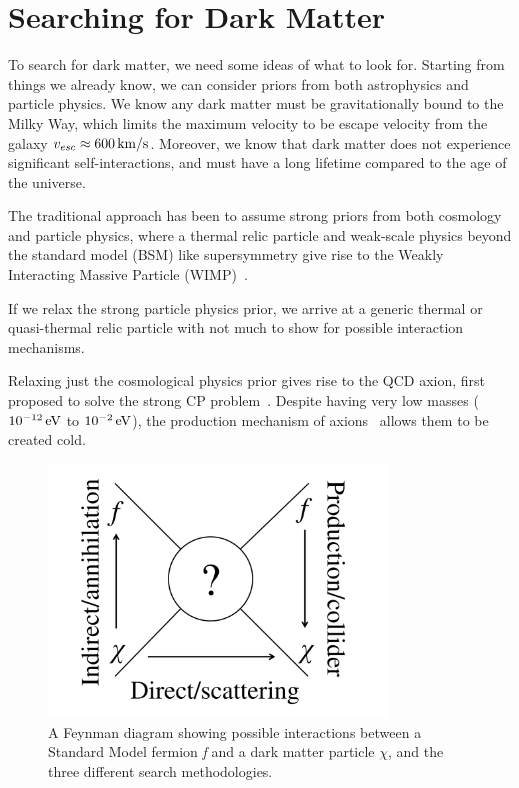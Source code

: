 \section{Searching for Dark Matter}

To search for dark matter, we need some ideas of what to look for. Starting from things we already know, we can consider priors from both astrophysics and particle physics. We know any dark matter must be gravitationally bound to the Milky Way, which limits the maximum velocity to be escape velocity from the galaxy $v_{esc} \approx 600\,\mathrm{km/s}$. Moreover, we know that dark matter does not experience significant self-interactions, and must have a long lifetime compared to the age of the universe.

The traditional approach has been to assume strong priors from both cosmology and particle physics, where a thermal relic particle and weak-scale physics beyond the standard model (BSM) like supersymmetry give rise to the Weakly Interacting Massive Particle (WIMP)~\cite{Jungman:1995df}.

If we relax the strong particle physics prior, we arrive at a generic thermal or quasi-thermal relic particle with not much to show for possible interaction mechanisms.

Relaxing just the cosmological physics prior gives rise to the QCD axion, first proposed to solve the strong CP problem~\cite{Peccei:1977,Weinberg:1978,Wilczek:1978}. Despite having very low masses ($10^{-12}\,\mathrm{eV}$ to $10^{-2}\,\mathrm{eV}$), the production mechanism of axions~\cite{Preskill:1983,Abbott:1983,Dine:1983} allows them to be created cold.

\begin{figure}[htb]
    \centering
    \includegraphics[width=0.8\textwidth]{figures/dm/feynman_diag}
    \caption{A Feynman diagram showing possible interactions between a Standard Model fermion \textit{f} and a dark matter particle $\chi$, and the three different search methodologies.}\label{fig:feynman}
\end{figure}

